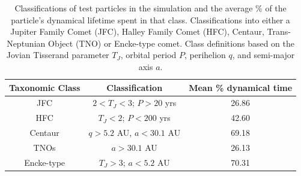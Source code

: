 \begin{table}[t!]
\centering
\caption[Particles classes and their mean dynamical lifetimes]{Classifications of test particles in the simulation and the average \% of the particle's dynamical lifetime spent in that class. Classifications into either a Jupiter Family Comet (JFC), Halley Family Comet (HFC), Centaur, Trans-Neptunian Object (TNO) or Encke-type comet. Class definitions based on the Jovian Tisserand parameter $T_J$, orbital period $P$, perihelion $q$, and semi-major axis $a$.}\vspace{1.5ex}
\label{table:class}
\begin{tabular}{ccc} \toprule \toprule
Taxonomic Class & Classification                                      & Mean \% dynamical time \\ \midrule
JFC             & $2 < T_J < 3$; $P > 20$ yrs & 26.86                  \\
HFC             & $T_J < 2$; $P < 200$ yrs               & 42.60                  \\
Centaur         & $q > 5.2$ AU, $a < 30.1$ AU          & 69.18                  \\
TNOs            & $a > 30.1$ AU                              & 26.13                  \\
Encke-type          & $T_J > 3$; $a < 5.2$ AU             & 70.31                 
\end{tabular}
\vspace{-3ex}
\end{table}







